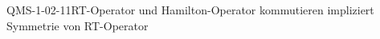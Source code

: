 
\begin{CONC}{QMS-1-02-11}{RT-Operator und Hamilton-Operator kommutieren impliziert Symmetrie von RT-Operator}
\end{CONC}
